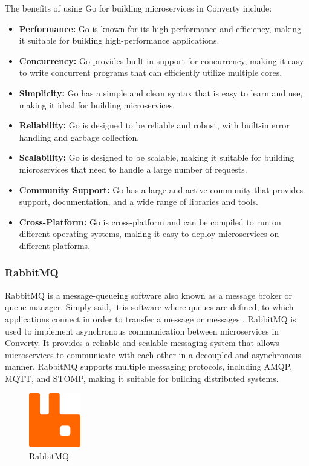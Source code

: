 The benefits of using Go for building microservices in Converty include:

\begin{itemize}
    \item \textbf{Performance:} Go is known for its high performance and efficiency, making it suitable for building high-performance applications.
    \item \textbf{Concurrency:} Go provides built-in support for concurrency, making it easy to write concurrent programs that can efficiently utilize multiple cores.
    \item \textbf{Simplicity:} Go has a simple and clean syntax that is easy to learn and use, making it ideal for building microservices.
    \item \textbf{Reliability:} Go is designed to be reliable and robust, with built-in error handling and garbage collection.
    \item \textbf{Scalability:} Go is designed to be scalable, making it suitable for building microservices that need to handle a large number of requests.
    \item \textbf{Community Support:} Go has a large and active community that provides support, documentation, and a wide range of libraries and tools.
    \item \textbf{Cross-Platform:} Go is cross-platform and can be compiled to run on different operating systems, making it easy to deploy microservices on different platforms.
\end{itemize}

\subsubsection{RabbitMQ}
RabbitMQ is a message-queueing software also known as a message broker or queue manager. Simply said, it is software where queues are defined, to which applications connect in order to transfer a message or messages \cite{rabbitmq}. RabbitMQ is used to implement asynchronous communication between microservices in Converty. It provides a reliable and scalable messaging system that allows microservices to communicate with each other in a decoupled and asynchronous manner. RabbitMQ supports multiple messaging protocols, including AMQP, MQTT, and STOMP, making it suitable for building distributed systems.

\begin{figure}[H]
    \centering
    \includegraphics[width=0.2\textwidth]{Images/rabbitmq.png}
    \caption{RabbitMQ}
    \label{fig:rabbitmq}
\end{figure}

